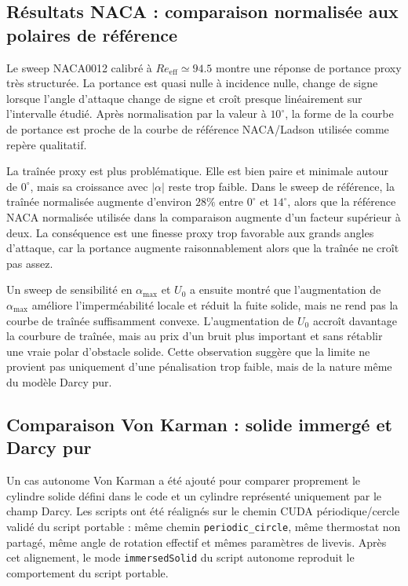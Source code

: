 \documentclass[11pt,a4paper]{article}
\begin{document}
\subsection{Résultats NACA : comparaison normalisée aux polaires de référence}

Le sweep NACA0012 calibré à $Re_{\mathrm{eff}}\simeq94.5$ montre une réponse de portance proxy très structurée. La portance est quasi nulle à incidence nulle, change de signe lorsque l'angle d'attaque change de signe et croît presque linéairement sur l'intervalle étudié. Après normalisation par la valeur à $10^\circ$, la forme de la courbe de portance est proche de la courbe de référence NACA/Ladson utilisée comme repère qualitatif.

La traînée proxy est plus problématique. Elle est bien paire et minimale autour de $0^\circ$, mais sa croissance avec $|\alpha|$ reste trop faible. Dans le sweep de référence, la traînée normalisée augmente d'environ $28\%$ entre $0^\circ$ et $14^\circ$, alors que la référence NACA normalisée utilisée dans la comparaison augmente d'un facteur supérieur à deux. La conséquence est une finesse proxy trop favorable aux grands angles d'attaque, car la portance augmente raisonnablement alors que la traînée ne croît pas assez.

Un sweep de sensibilité en $\alpha_{\max}$ et $U_0$ a ensuite montré que l'augmentation de $\alpha_{\max}$ améliore l'imperméabilité locale et réduit la fuite solide, mais ne rend pas la courbe de traînée suffisamment convexe. L'augmentation de $U_0$ accroît davantage la courbure de traînée, mais au prix d'un bruit plus important et sans rétablir une vraie polar d'obstacle solide. Cette observation suggère que la limite ne provient pas uniquement d'une pénalisation trop faible, mais de la nature même du modèle Darcy pur.

\subsection{Comparaison Von Karman : solide immergé et Darcy pur}

Un cas autonome Von Karman a été ajouté pour comparer proprement le cylindre solide défini dans le code et un cylindre représenté uniquement par le champ Darcy. Les scripts ont été réalignés sur le chemin CUDA périodique/cercle validé du script portable : même chemin \texttt{periodic\_circle}, même thermostat non partagé, même angle de rotation effectif et mêmes paramètres de livevis. Après cet alignement, le mode \texttt{immersedSolid} du script autonome reproduit le comportement du script portable.
\end{document}
